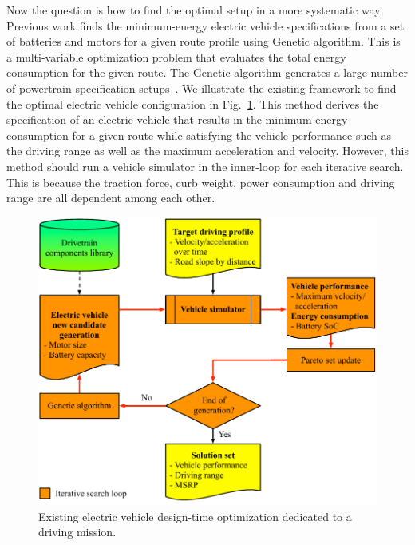 \documentclass[journal]{IEEEtran}
\begin{document}

Now the question is how to find the optimal setup in a more systematic way. Previous work finds the minimum-energy electric vehicle specifications from a set of batteries and motors for a given route profile using Genetic algorithm. This is a multi-variable optimization problem that evaluates the total energy consumption for the given route. The Genetic algorithm generates a large number of powertrain specification setups~\cite{Ribau:AE14}. We illustrate the existing framework to find the optimal electric vehicle configuration in Fig.~\ref{fig:framework_existing}. This method derives the specification of an electric vehicle that results in the minimum energy consumption for a given route while satisfying the vehicle performance such as the driving range as well as the maximum acceleration and velocity. However, this method should run a vehicle simulator in the inner-loop for each iterative search. This is because the traction force, curb weight, power consumption and driving range are all dependent among each other.



\begin{figure}
\centering
\includegraphics[width=1.0\hsize]{Figures/Framework_existing.pdf}
\caption{Existing electric vehicle design-time optimization dedicated to a driving mission.}
\label{fig:framework_existing}
\end{figure}    
\end{document}
